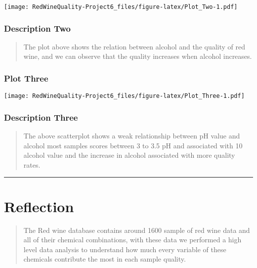 \documentclass[]{article}
\begin{document}
\texttt{[image: RedWineQuality-Project6\_files/figure-latex/Plot\_Two-1.pdf]}

\hypertarget{description-two}{%
\subsubsection{Description Two}\label{description-two}}

\begin{quote}
The plot above shows the relation between alcohol and the quality of red
wine, and we can observe that the quality increases when alcohol
increases.
\end{quote}

\hypertarget{plot-three}{%
\subsubsection{Plot Three}\label{plot-three}}

\texttt{[image: RedWineQuality-Project6\_files/figure-latex/Plot\_Three-1.pdf]}

\hypertarget{description-three}{%
\subsubsection{Description Three}\label{description-three}}

\begin{quote}
The above scatterplot shows a weak relationship between pH value and
alcohol most samples scores between 3 to 3.5 pH and associated with 10
alcohol value and the increase in alcohol associated with more quality
rates.
\end{quote}

\begin{center}\rule{0.5\linewidth}{\linethickness}\end{center}

\hypertarget{reflection}{%
\section{Reflection}\label{reflection}}

\begin{quote}
The Red wine database contains around 1600 sample of red wine data and
all of their chemical combinations, with these data we performed a high
level data analysis to understand how much every variable of these
chemicals contribute the most in each sample quality.
\end{quote}
\end{document}
